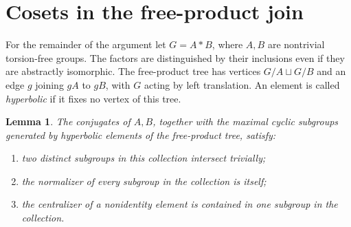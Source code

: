 \documentclass[11pt]{article}
\newtheorem{lemma}[theorem]{Lemma}
\theoremstyle{remark}
\begin{document}
\section{Cosets in the free-product join}

For the remainder of the argument let \(G=A*B\), where \(A,B\) are
nontrivial torsion-free groups. The factors are distinguished by their
inclusions even if they are abstractly isomorphic.
The free-product tree has vertices \(G/A\sqcup G/B\) and an edge \(g\)
joining \(gA\) to \(gB\), with \(G\) acting by left translation.
An element is called \emph{hyperbolic} if it fixes no vertex of this tree.

\begin{lemma}\label{lem:tree}
The conjugates of \(A,B\), together with the maximal cyclic subgroups
generated by hyperbolic elements of the free-product tree, satisfy:
\begin{enumerate}
\item two distinct subgroups in this collection intersect trivially;
\item the normalizer of every subgroup in the collection is itself;
\item the centralizer of a nonidentity element is contained in one
      subgroup in the collection.
\end{enumerate}
\end{lemma}
\end{document}
